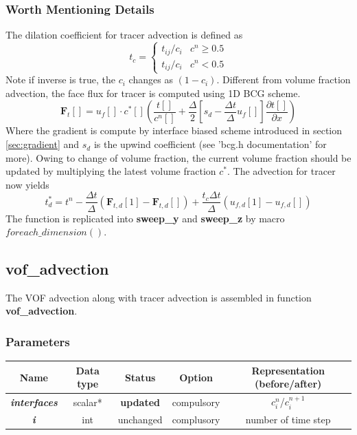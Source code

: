 \documentclass[a4paper]{article}
\newcommand{\func}[1]{\textbf{\textcolor{function}{#1}}}
\newcommand{\para}[1]{\textbf{\emph{\textcolor{para}{#1}}}}
\begin{document}
\subsubsection{Worth Mentioning Details}
The dilation coefficient for tracer advection is defined as 
\begin{equation}
    t_c=\left\{
    \begin{array}{cc}
        t_{ij}/c_i & c^n\geq0.5 \\
        t_{ij}/c_i & c^n<0.5
    \end{array}
    \right.
\end{equation}
Note if inverse is true, the $c_i$ changes as $(1-c_i)$. Different from volume fraction advection, the face flux for tracer is computed using 1D BCG scheme.
\begin{equation}
    \mathbf{F}_t[] = u_f[]\cdot c^\ast[](\frac{t[]}{c^n[]}+\frac{\Delta}{2}[s_d-\frac{\Delta t}{\Delta}u_f[]]\frac{\partial t[]}{\partial x})
\end{equation}
Where the gradient is compute by interface biased scheme introduced in section \ref{sec:gradient} and $s_d$ is the upwind coefficient (see 'bcg.h documentation' for more).
Owing to change of volume fraction, the current volume fraction should be updated by multiplying the latest volume fraction $c^\ast$. The advection for tracer now yields
\begin{equation}
    t^\ast_d = t^n - \frac{\Delta t}{\Delta}(\mathbf{F}_{t,d}[1]-\mathbf{F}_{t,d}[]) + \frac{t_c\Delta t}{\Delta}(u_{f,d}[1]-u_{f,d}[])
\end{equation}
The function is replicated into \func{sweep\_y} and \func{sweep\_z} by macro $foreach\_dimension()$.
\subsection{\func{vof\_advection}}
The VOF advection along with tracer advection is assembled in function \func{vof\_advection}.
\subsubsection{Parameters}
\begin{table}[h]
  \centering
  \begin{tabular}{|c|c|c|c|c|}
    \hline
    Name & Data type & Status & Option & Representation (before/after)\\[0.5ex]
    \hline\hline
    \rowcolor{output} \para{interfaces} & scalar* & \textbf{updated} & compulsory & $c_i^n$/$c_i^{n+1}$\\
    \hline
    \para{i} & int & unchanged & complusory & number of time step\\
    \hline
  \end{tabular}
\end{table}
\end{document}
